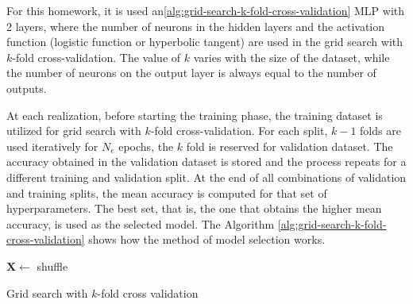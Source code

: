 \documentclass[12pt,a4paper]{article}
\begin{document}
For this homework, it is used an\ref{alg:grid-search-k-fold-cross-validation} MLP with 2 layers, where the number of neurons in the hidden layers and the activation function (logistic function or hyperbolic tangent) are used in the grid search with \(k\)-fold cross-validation. The value of \(k\) varies with the size of the dataset, while the number of neurons on the output layer is always equal to the number of outputs.

At each realization, before starting the training phase, the training dataset is utilized for grid search with \(k\)-fold cross-validation. For each split, \(k-1\) folds are used iteratively for \(N_e\) epochs, the \(k\) fold is reserved for validation dataset. The accuracy obtained in the validation dataset is stored and the process repeats for a different training and validation split. At the end of all combinations of validation and training splits, the mean accuracy is computed for that set of hyperparameters. The best set, that is, the one that obtains the higher mean accuracy, is used as the selected model. The Algorithm \ref{alg:grid-search-k-fold-cross-validation} shows how the method of model selection works.

\begin{algorithm}[H]
    \DontPrintSemicolon
      
      
    \(\mathbf{X} \leftarrow\) shuffle
    

    \caption{Grid search with \(k\)-fold cross validation}
    \label{alg:grid-search-k-fold-cross-validation}
\end{algorithm}
\end{document}
